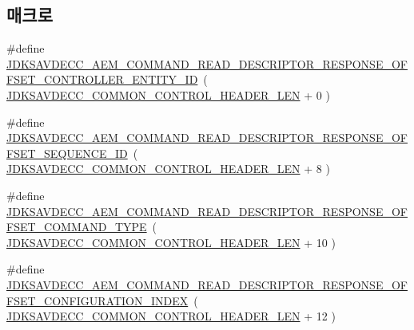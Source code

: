 \subsection*{매크로}
\begin{DoxyCompactItemize}
\item 
\#define \hyperlink{group__command__read__descriptor__response_gacddb067d5b7cb46aba0d5b01dd3f757e}{J\+D\+K\+S\+A\+V\+D\+E\+C\+C\+\_\+\+A\+E\+M\+\_\+\+C\+O\+M\+M\+A\+N\+D\+\_\+\+R\+E\+A\+D\+\_\+\+D\+E\+S\+C\+R\+I\+P\+T\+O\+R\+\_\+\+R\+E\+S\+P\+O\+N\+S\+E\+\_\+\+O\+F\+F\+S\+E\+T\+\_\+\+C\+O\+N\+T\+R\+O\+L\+L\+E\+R\+\_\+\+E\+N\+T\+I\+T\+Y\+\_\+\+ID}~( \hyperlink{group__jdksavdecc__avtp__common__control__header_gaae84052886fb1bb42f3bc5f85b741dff}{J\+D\+K\+S\+A\+V\+D\+E\+C\+C\+\_\+\+C\+O\+M\+M\+O\+N\+\_\+\+C\+O\+N\+T\+R\+O\+L\+\_\+\+H\+E\+A\+D\+E\+R\+\_\+\+L\+EN} + 0 )
\item 
\#define \hyperlink{group__command__read__descriptor__response_ga5be9bf13e08bb48fe7b5f971b9739ced}{J\+D\+K\+S\+A\+V\+D\+E\+C\+C\+\_\+\+A\+E\+M\+\_\+\+C\+O\+M\+M\+A\+N\+D\+\_\+\+R\+E\+A\+D\+\_\+\+D\+E\+S\+C\+R\+I\+P\+T\+O\+R\+\_\+\+R\+E\+S\+P\+O\+N\+S\+E\+\_\+\+O\+F\+F\+S\+E\+T\+\_\+\+S\+E\+Q\+U\+E\+N\+C\+E\+\_\+\+ID}~( \hyperlink{group__jdksavdecc__avtp__common__control__header_gaae84052886fb1bb42f3bc5f85b741dff}{J\+D\+K\+S\+A\+V\+D\+E\+C\+C\+\_\+\+C\+O\+M\+M\+O\+N\+\_\+\+C\+O\+N\+T\+R\+O\+L\+\_\+\+H\+E\+A\+D\+E\+R\+\_\+\+L\+EN} + 8 )
\item 
\#define \hyperlink{group__command__read__descriptor__response_ga07ee8e5ce7d5fef2e6296efd2e830c19}{J\+D\+K\+S\+A\+V\+D\+E\+C\+C\+\_\+\+A\+E\+M\+\_\+\+C\+O\+M\+M\+A\+N\+D\+\_\+\+R\+E\+A\+D\+\_\+\+D\+E\+S\+C\+R\+I\+P\+T\+O\+R\+\_\+\+R\+E\+S\+P\+O\+N\+S\+E\+\_\+\+O\+F\+F\+S\+E\+T\+\_\+\+C\+O\+M\+M\+A\+N\+D\+\_\+\+T\+Y\+PE}~( \hyperlink{group__jdksavdecc__avtp__common__control__header_gaae84052886fb1bb42f3bc5f85b741dff}{J\+D\+K\+S\+A\+V\+D\+E\+C\+C\+\_\+\+C\+O\+M\+M\+O\+N\+\_\+\+C\+O\+N\+T\+R\+O\+L\+\_\+\+H\+E\+A\+D\+E\+R\+\_\+\+L\+EN} + 10 )
\item 
\#define \hyperlink{group__command__read__descriptor__response_ga8c4fa190d360df1986bef903b1cfbb94}{J\+D\+K\+S\+A\+V\+D\+E\+C\+C\+\_\+\+A\+E\+M\+\_\+\+C\+O\+M\+M\+A\+N\+D\+\_\+\+R\+E\+A\+D\+\_\+\+D\+E\+S\+C\+R\+I\+P\+T\+O\+R\+\_\+\+R\+E\+S\+P\+O\+N\+S\+E\+\_\+\+O\+F\+F\+S\+E\+T\+\_\+\+C\+O\+N\+F\+I\+G\+U\+R\+A\+T\+I\+O\+N\+\_\+\+I\+N\+D\+EX}~( \hyperlink{group__jdksavdecc__avtp__common__control__header_gaae84052886fb1bb42f3bc5f85b741dff}{J\+D\+K\+S\+A\+V\+D\+E\+C\+C\+\_\+\+C\+O\+M\+M\+O\+N\+\_\+\+C\+O\+N\+T\+R\+O\+L\+\_\+\+H\+E\+A\+D\+E\+R\+\_\+\+L\+EN} + 12 )

\end{DoxyCompactItemize}
